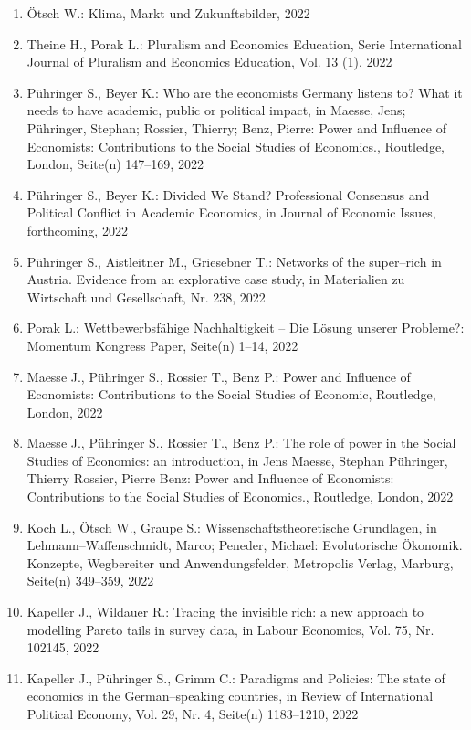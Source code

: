 \begin{enumerate}
    	 \item Ötsch W.: Klima, Markt und Zukunftsbilder, 2022
	 \item Theine H., Porak L.: Pluralism and Economics Education, Serie International Journal of Pluralism and Economics Education, Vol. 13 (1), 2022
	 \item Pühringer S., Beyer K.: Who are the economists Germany listens to? What it needs to have academic, public or political impact, in Maesse, Jens; Pühringer, Stephan; Rossier, Thierry; Benz, Pierre: Power and Influence of Economists: Contributions to the Social Studies of Economics., Routledge, London, Seite(n) 147--169, 2022
	 \item Pühringer S., Beyer K.: Divided We Stand? Professional Consensus and Political Conflict in Academic Economics, in Journal of Economic Issues, forthcoming, 2022
	 \item Pühringer S., Aistleitner M., Griesebner T.: Networks of the super--rich in Austria. Evidence from an explorative case study, in Materialien zu Wirtschaft und Gesellschaft, Nr. 238, 2022
	 \item Porak L.: Wettbewerbsfähige Nachhaltigkeit – Die Lösung unserer Probleme?: Momentum Kongress Paper, Seite(n) 1--14, 2022
	 \item Maesse J., Pühringer S., Rossier T., Benz P.: Power and Influence of Economists: Contributions to the Social Studies of Economic, Routledge, London, 2022
	 \item Maesse J., Pühringer S., Rossier T., Benz P.: The role of power in the Social Studies of Economics: an introduction, in Jens Maesse, Stephan Pühringer, Thierry Rossier,  Pierre Benz: Power and Influence of Economists: Contributions to the Social Studies of Economics., Routledge, London, 2022
	 \item Koch L., Ötsch W., Graupe S.: Wissenschaftstheoretische Grundlagen, in Lehmann--Waffenschmidt, Marco; Peneder, Michael: Evolutorische Ökonomik. Konzepte, Wegbereiter und Anwendungsfelder, Metropolis Verlag, Marburg, Seite(n) 349--359, 2022
	 \item Kapeller J., Wildauer R.: Tracing the invisible rich: a new approach to modelling Pareto tails in survey data, in Labour Economics, Vol. 75, Nr. 102145, 2022
	 \item Kapeller J., Pühringer S., Grimm C.: Paradigms and Policies: The state of economics in the German--speaking countries, in Review of International Political Economy, Vol. 29, Nr. 4, Seite(n) 1183--1210, 2022

\end{enumerate}
